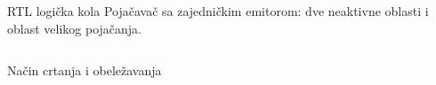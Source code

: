 \begin{frame}[label=10-s010]{RTL logička kola}
\setlength{\abovedisplayskip}{4pt}\setlength{\belowdisplayskip}{4pt}\setlength{\abovedisplayshortskip}{3pt}\setlength{\belowdisplayshortskip}{3pt}
Pojačavač sa zajedničkim emitorom: dve neaktivne oblasti i oblast velikog pojačanja.\par\bigskip\begin{columns}[T,onlytextwidth]\centering \end{columns}\medskip\centering Način crtanja i obeležavanja
\end{frame}

